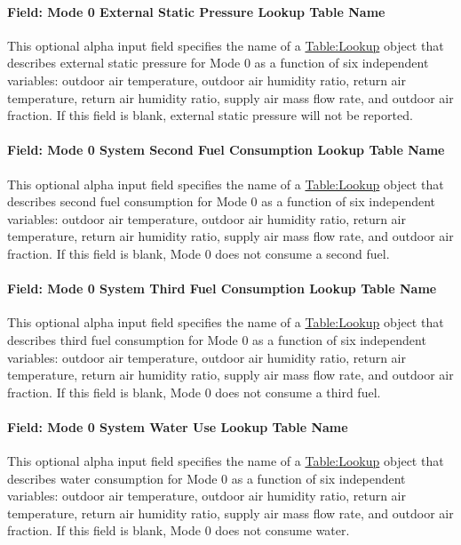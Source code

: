 \paragraph{Field: Mode 0 External Static Pressure Lookup Table Name}
This optional alpha input field specifies the name of a \hyperref[tablelookup]{Table:Lookup} object that describes external static pressure for Mode 0 as a function of six independent variables: outdoor air temperature, outdoor air humidity ratio, return air temperature, return air humidity ratio, supply air mass flow rate, and outdoor air fraction. If this field is blank, external static pressure will not be reported.

\paragraph{Field: Mode 0 System Second Fuel Consumption Lookup Table Name}
This optional alpha input field specifies the name of a \hyperref[tablelookup]{Table:Lookup} object that describes second fuel consumption for Mode 0 as a function of six independent variables: outdoor air temperature, outdoor air humidity ratio, return air temperature, return air humidity ratio, supply air mass flow rate, and outdoor air fraction. If this field is blank, Mode 0 does not consume a second fuel.

\paragraph{Field: Mode 0 System Third Fuel Consumption Lookup Table Name}
This optional alpha input field specifies the name of a \hyperref[tablelookup]{Table:Lookup} object that describes third fuel consumption for Mode 0 as a function of six independent variables: outdoor air temperature, outdoor air humidity ratio, return air temperature, return air humidity ratio, supply air mass flow rate, and outdoor air fraction. If this field is blank, Mode 0 does not consume a third fuel.

\paragraph{Field: Mode 0 System Water Use Lookup Table Name}
This optional alpha input field specifies the name of a \hyperref[tablelookup]{Table:Lookup} object that describes water consumption for Mode 0 as a function of six independent variables: outdoor air temperature, outdoor air humidity ratio, return air temperature, return air humidity ratio, supply air mass flow rate, and outdoor air fraction. If this field is blank, Mode 0 does not consume water.

